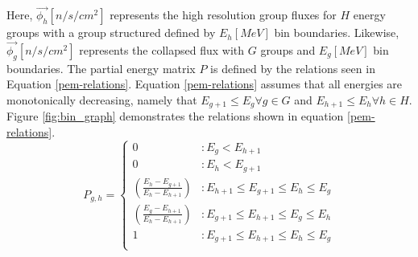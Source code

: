 \documentclass{article}
\begin{document}
Here, $\vec{\phi_h}[n/s/cm^2]$ represents the high resolution group fluxes for $H$ energy groups with
a group structured defined by $E_h[MeV]$ bin boundaries. Likewise, $\vec{\phi_g}[n/s/cm^2]$ represents
the collapsed flux with $G$ groups and $E_g[MeV]$ bin boundaries. The partial energy
matrix $P$ is defined by the relations seen in Equation \ref{pem-relations}.
Equation \ref{pem-relations} assumes that all energies are monotonically decreasing, namely
that $E_{g+1} \le E_{g} \forall g\in G$ and $E_{h+1} \le E_{h} \forall h\in H$. Figure \ref{fig:bin_graph}
demonstrates the relations shown in equation \ref{pem-relations}.
\begin{equation}
\label{pem-relations}
P_{g,h} = \left\{
\begin{array}{ll}
    0 & : E_{g} < E_{h+1} \\
    0 & : E_{h} < E_{g+1} \\
    \left(\frac{E_h - E_{g+1}}{E_h - E_{h+1}}\right) & : E_{h+1} \le E_{g+1} \le E_{h} \le E_{g}\\
    \left(\frac{E_{g} - E_{h+1}}{E_h - E_{h+1}}\right) & : E_{g+1} \le E_{h+1} \le E_{g} \le E_{h} \\
    1 & : E_{g+1} \le E_{h+1} \le E_{h} \le E_{g} \\
\end{array}
\right.
\end{equation}
\end{document}
